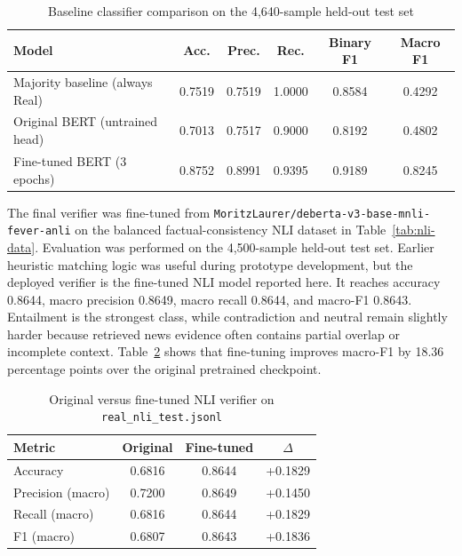 \documentclass[11pt]{article}
\newcommand{\code}[1]{\texttt{#1}}
\begin{document}
\begin{table}[H]
    \centering
    \caption{Baseline classifier comparison on the 4,640-sample held-out test set}
    \label{tab:bert-compare}
    \begin{tabular}{@{}lccccc@{}}
        \toprule
        \textbf{Model} & \textbf{Acc.} & \textbf{Prec.} & \textbf{Rec.} & \textbf{Binary F1} & \textbf{Macro F1} \\
        \midrule
        Majority baseline (always Real) & 0.7519 & 0.7519 & 1.0000 & 0.8584 & 0.4292 \\
        Original BERT (untrained head) & 0.7013 & 0.7517 & 0.9000 & 0.8192 & 0.4802 \\
        Fine-tuned BERT (3 epochs) & 0.8752 & 0.8991 & 0.9395 & 0.9189 & 0.8245 \\
        \bottomrule
    \end{tabular}
\end{table}

The final verifier was fine-tuned from
\code{MoritzLaurer/deberta-v3-base-mnli-fever-anli} on the balanced
factual-consistency NLI dataset in Table~\ref{tab:nli-data}. Evaluation was
performed on the 4,500-sample held-out test set. Earlier heuristic matching
logic was useful during prototype development, but the deployed verifier is the
fine-tuned NLI model reported here. It reaches accuracy 0.8644, macro precision
0.8649, macro recall 0.8644, and macro-F1 0.8643. Entailment is the strongest
class, while contradiction and neutral remain slightly harder because retrieved
news evidence often contains partial overlap or incomplete context.
Table~\ref{tab:nli-compare} shows that fine-tuning improves macro-F1 by 18.36
percentage points over the original pretrained checkpoint.

\begin{table}[H]
    \centering
    \caption{Original versus fine-tuned NLI verifier on \code{real\_nli\_test.jsonl}}
    \label{tab:nli-compare}
    \begin{tabular}{@{}lccc@{}}
        \toprule
        \textbf{Metric} & \textbf{Original} & \textbf{Fine-tuned} & \textbf{$\Delta$} \\
        \midrule
        Accuracy & 0.6816 & 0.8644 & +0.1829 \\
        Precision (macro) & 0.7200 & 0.8649 & +0.1450 \\
        Recall (macro) & 0.6816 & 0.8644 & +0.1829 \\
        F1 (macro) & 0.6807 & 0.8643 & +0.1836 \\
        \bottomrule
    \end{tabular}
\end{table}
\end{document}

